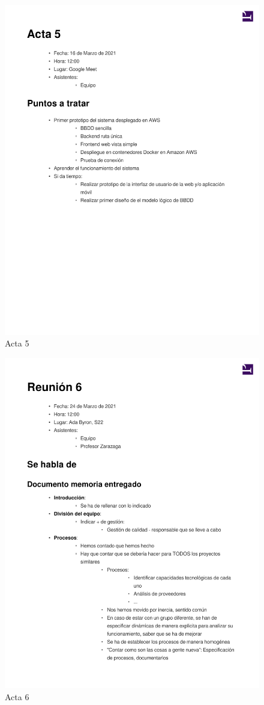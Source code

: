 \documentclass{article}
\begin{document}
\begin{figure}
    \includegraphics[width=.8\textwidth]{../../actas_reuniones/acta5.pdf}
    \caption{Acta 5}
\end{figure}
\begin{figure}
    \includegraphics[width=.8\textwidth]{../../actas_reuniones/acta6.pdf}
    \caption{Acta 6}
\end{figure}
\end{document}
